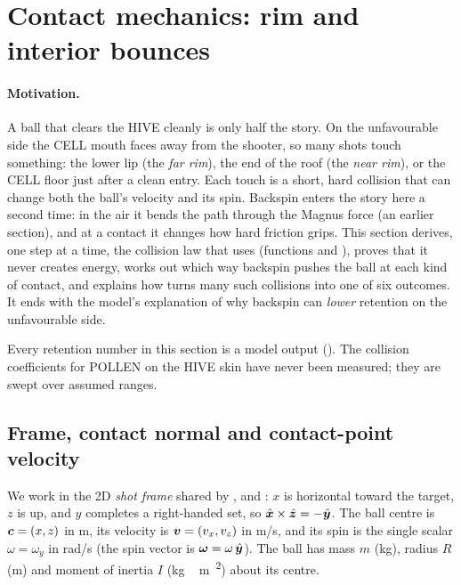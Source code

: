 \section{Contact mechanics: rim and interior bounces}
\label{sec:contact}


\paragraph{Motivation.}
A ball that clears the HIVE cleanly is only half the story. On the unfavourable side the CELL
mouth faces away from the shooter, so many shots touch something: the lower lip (the
\emph{far rim}), the end of the roof (the \emph{near rim}), or the CELL floor just after a clean
entry. Each touch is a short, hard collision that can change both the ball's velocity and its
spin. Backspin enters the story here a second time: in the air it bends the path through the
Magnus force (an earlier section), and at a contact it changes how hard friction grips. This
section derives, one step at a time, the collision law that  uses
(functions  and ), proves that it never creates energy, works
out which way backspin pushes the ball at each kind of contact, and explains how
 turns many such collisions into one of six outcomes. It ends with the
model's explanation of why backspin can \emph{lower} retention on the unfavourable side.

Every retention number in this section is a model output (\predicted). The collision
coefficients for POLLEN on the HIVE skin have never been measured; they are swept over assumed
ranges.

\subsection{Frame, contact normal and contact-point velocity}
\label{sec:contact-frame}

We work in the 2D \emph{shot frame} shared by ,  and
: $x$ is horizontal toward the target, $z$ is up, and $y$ completes a
right-handed set, so $\hat{\bm{x}}\times\hat{\bm{z}} = -\hat{\bm{y}}$. The ball centre is
$\bm{c}=(x,z)$ in \unit{m}, its velocity is $\bm{v}=(v_x,v_z)$ in \unit{m/s}, and its spin
is the single scalar $\omega=\omega_y$ in \unit{rad/s} (the spin vector is
$\bm{\omega}=\omega\,\hat{\bm{y}}$). The ball has mass $m$ (\unit{kg}), radius $R$
(\unit{m}) and moment of inertia $I$ (\unit{kg\,m\textsuperscript{2}}) about its centre.


